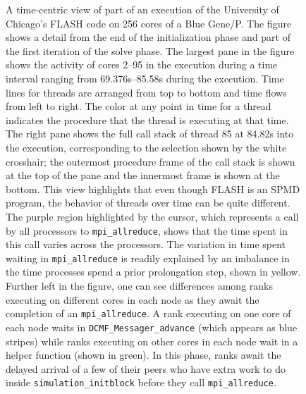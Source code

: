\documentclass[11pt,twoside,letterpaper]{report}
\begin{document}
\begin{figure}[t]
\caption{A time-centric view of  part of an execution of the University of Chicago's FLASH code  on 256 cores of a Blue Gene/P. The figure shows a detail from the end of the initialization phase and  part of the first iteration of the solve phase. The largest pane in the figure shows the activity of cores 2--95 in the execution during a time interval ranging from 69.376s--85.58s during the execution.  Time lines for threads are arranged from top to bottom and time flows from left to right. The color at any point in time for a thread indicates the procedure that the thread is executing at that time. The right pane shows the full call stack of thread 85 at 84.82s into the execution, corresponding to the selection shown by the white crosshair; the outermost procedure frame of the call stack is shown at the top of the pane and the innermost frame is shown at the bottom. This view highlights that even though FLASH is an SPMD program, the behavior of threads over time can be quite different. The purple region highlighted by the cursor, which represents a call by all processors to {\tt mpi\_allreduce}, shows that the time spent in this call varies across the processors. The variation in time spent waiting in {\tt mpi\_allreduce} is readily explained by an imbalance in the time processes spend a prior prolongation step, shown in yellow. Further left in the figure, one can see differences among ranks executing on different cores in each node as they await the  completion of an {\tt mpi\_allreduce}. A rank executing on one core of each node waits in {\tt DCMF\_Messager\_advance} (which appears as blue stripes) while ranks executing on other cores in each node wait in a helper function (shown in green). In this phase, ranks await the delayed arrival of a few of their peers who have extra work to do inside {\tt simulation\_initblock} before they call  {\tt mpi\_allreduce}. }
\label{fig:time-centric}
\end{figure}
\end{document}
